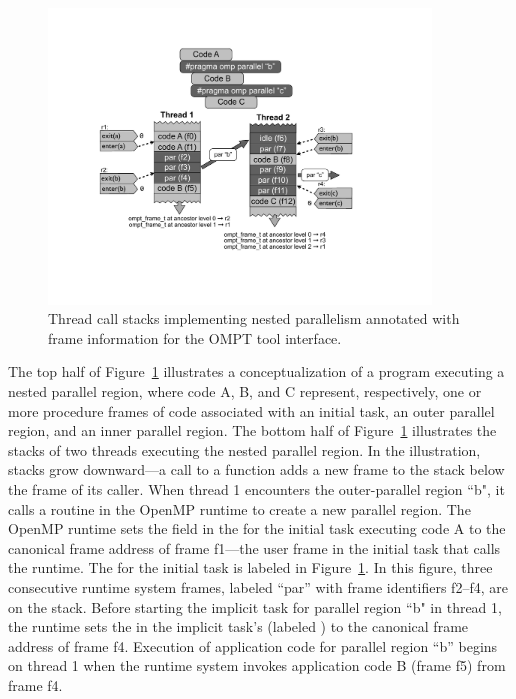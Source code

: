    \begin{figure}[h]
    \centering
        \includegraphics[width=4in]{appendices/callstack-cropped.pdf}
    \caption{Thread call stacks implementing nested parallelism
      annotated with frame information for the OMPT tool interface.}
    \label{fig:frame}
\end{figure}

The top half of Figure~\ref{fig:frame} illustrates a 
conceptualization of a program executing a nested
parallel region, where code A, B, and C represent, respectively, one
or more procedure frames of code
associated with an initial task, an outer parallel region, and an inner parallel
region. The bottom half of Figure~\ref{fig:frame} illustrates the stacks of two
threads executing the nested parallel region. 
In the illustration, stacks grow downward---a call to a function adds
a new frame to the stack below the frame of its caller.
When thread 1 encounters the outer-parallel
region ``b", it calls a routine in the OpenMP runtime to
create a new parallel region. The OpenMP runtime sets the
 field in the  for the initial
task executing code A to the canonical frame address of frame f1---the user frame in the initial task
that calls the runtime. The  for the initial task
is labeled  in Figure~\ref{fig:frame}. In this figure, three
consecutive runtime system frames, labeled ``par'' with frame
identifiers f2--f4, are on the stack.  Before starting the implicit
task for parallel region ``b" in thread 1, the runtime sets the
 in the implicit task's  (labeled
) to the canonical frame address of frame f4. Execution of application code for parallel region
``b'' begins on thread 1 when the runtime system invokes application
code B (frame f5) from frame f4.

